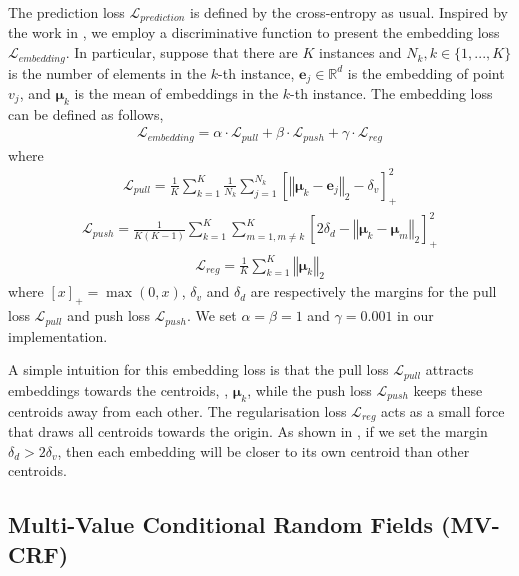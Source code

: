 \documentclass[10pt,twocolumn,letterpaper]{article}
\begin{document}
The prediction loss $\mathcal{L}_{prediction}$ is defined by the cross-entropy
as usual. Inspired by the work in \cite{de-discriminative-arxiv17}, we employ a
discriminative function to present the embedding loss $\mathcal{L}_{embedding}$.
In particular, suppose that there are $K$ instances and $N_k, k\in\{1,...,K\}$
is the number of elements in the $k$-th instance,
$\mathbf{e}_j \in \mathbb{R}^d$ is the embedding of point $v_j$, and
$\boldsymbol\mu_k$ is the mean of embeddings in the $k$-th instance. The
embedding loss can be defined as follows,
\begin{align}
  \label{eq:discriminative}
  \mathcal{L}_{embedding} = \alpha \cdot \mathcal{L}_{pull} + \beta \cdot \mathcal{L}_{push} + \gamma \cdot \mathcal{L}_{reg}
\end{align}
where
\begin{align}
  \label{eq:pull}
  \mathcal{L}_{pull} = \frac{1}{K} \sum_{k=1}^K \frac{1}{N_k} \sum_{j=1}^{N_k} \left [ \left \Vert \boldsymbol\mu_k - \mathbf{e}_j \right \Vert_2 - \delta_v \right ]^2_+
\end{align}
\begin{align}
  \label{eq:push}
  \mathcal{L}_{push} = \frac{1}{K(K-1)} \sum_{k=1}^K \sum_{m=1, m \neq k}^K \left [2\delta_d - \left \Vert \boldsymbol\mu_k - \boldsymbol\mu_m \right \Vert_2 \right ]^2_+
\end{align}
\begin{align}
  \label{eq:reg}
  \mathcal{L}_{reg} = \frac{1}{K} \sum_{k=1}^K \left \Vert \boldsymbol\mu_k \right \Vert_2
\end{align}
where $[x]_+=\max(0,x)$, $\delta_v$ and $\delta_d$ are respectively the margins
for the pull loss $\mathcal{L}_{pull}$ and push loss $\mathcal{L}_{push}$. We
set $\alpha = \beta = 1$ and $\gamma = 0.001$ in our implementation.

A simple intuition for this embedding loss is that the pull loss
$\mathcal{L}_{pull}$ attracts embeddings towards the centroids, \ie,
$\boldsymbol\mu_k$, while the push loss $\mathcal{L}_{push}$ keeps these
centroids away from each other. The regularisation loss $\mathcal{L}_{reg}$ acts
as a small force that draws all centroids towards the origin. As shown in
\cite{de-discriminative-arxiv17}, if we set the margin $\delta_d > 2\delta_v$,
then each embedding will be closer to its own centroid than other centroids.

\subsection{Multi-Value Conditional Random Fields (MV-CRF)}
\end{document}
